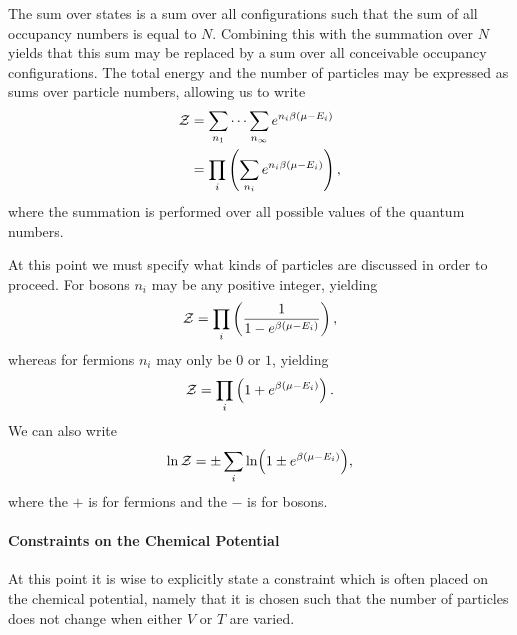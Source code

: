 The sum over states is a sum over all configurations such that the sum of all occupancy numbers is equal to $N$. Combining this with the summation over $N$ yields that this sum may be replaced by a sum over all conceivable occupancy configurations. The total energy and the number of particles may be expressed as sums over particle numbers, allowing us to write
\begin{align*}
	\mathcal{Z} &= \sum\limits_{n_{1}}\dots\sum\limits_{n_{\infty}}e^{n_{i}\beta(\mu - E_{i})} \\
	   &= \prod\limits_{i}\left(\sum\limits_{n_{i}}e^{n_{i}\beta(\mu - E_{i})}\right),
\end{align*}
where the summation is performed over all possible values of the quantum numbers.

At this point we must specify what kinds of particles are discussed in order to proceed. For bosons $n_{i}$ may be any positive integer, yielding
\begin{align*}
	\mathcal{Z} = \prod\limits_{i}\left(\frac{1}{1 - e^{\beta(\mu - E_{i})}}\right),
\end{align*}
whereas for fermions $n_{i}$ may only be $0$ or $1$, yielding
\begin{align*}
	\mathcal{Z} = \prod\limits_{i}\left(1 + e^{\beta(\mu - E_{i})}\right).
\end{align*}
We can also write
\begin{align*}
	\ln{\mathcal{Z}} = \pm\sum\limits_{i}\ln(1 \pm e^{\beta(\mu - E_{i})}),
\end{align*}
where the $+$ is for fermions and the $-$ is for bosons.

\paragraph{Constraints on the Chemical Potential}
At this point it is wise to explicitly state a constraint which is often placed on the chemical potential, namely that it is chosen such that the number of particles does not change when either $V$ or $T$ are varied.

